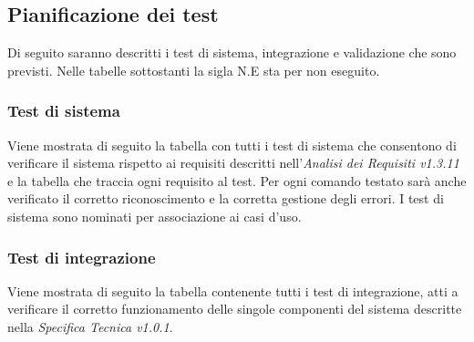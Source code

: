 \documentclass[a4paper]{article}
\begin{document}
	\subsection{Pianificazione dei test}
		Di seguito saranno descritti i test di sistema, integrazione e validazione che sono previsti.
		Nelle tabelle sottostanti la sigla N.E sta per non eseguito.				
	\subsubsection{Test di sistema}
		Viene mostrata di seguito la tabella con tutti i test di sistema che consentono di verificare il sistema rispetto ai requisiti descritti nell'\emph{Analisi dei Requisiti v1.3.11} e la tabella che traccia ogni requisito al test.
		Per ogni comando testato sarà anche verificato il corretto riconoscimento e la corretta gestione degli errori.
		I test di sistema sono nominati per associazione ai casi d'uso.
		
	\subsubsection{Test di integrazione}
		Viene mostrata di seguito la tabella contenente tutti i test di integrazione, atti a verificare il corretto funzionamento delle singole componenti del sistema descritte nella \emph{Specifica Tecnica v1.0.1}. 
			
\end{document}

